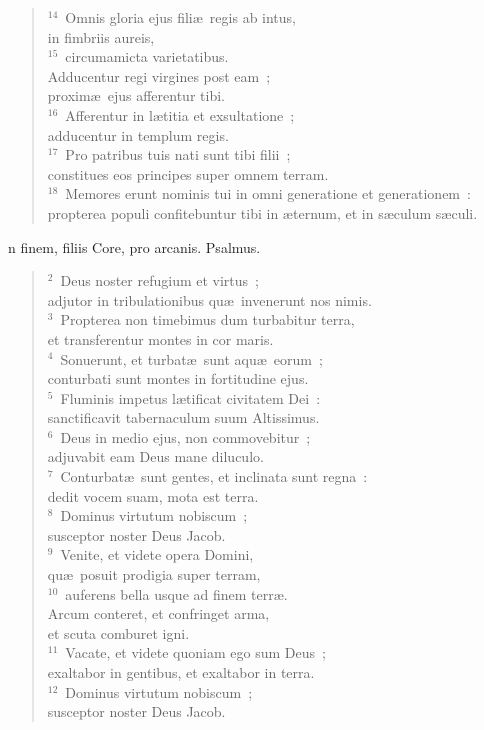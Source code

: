 \begin{verse}
${}^{14}$~Omnis gloria ejus fili\ae\ regis ab intus,\\ in fimbriis aureis,\\
${}^{15}$~circumamicta varietatibus.\\ Adducentur regi virgines post eam~;\\ proxim\ae\ ejus afferentur tibi.\\
${}^{16}$~Afferentur in l\ae titia et exsultatione~;\\ adducentur in templum regis.\\
${}^{17}$~Pro patribus tuis nati sunt tibi filii~;\\ constitues eos principes super omnem terram.\\
${}^{18}$~Memores erunt nominis tui in omni generatione et generationem~:\\ propterea populi confitebuntur tibi in \ae ternum, et in s\ae culum s\ae culi.\end{verse}



\bchapter[Psalm]
n finem, filiis Core, pro arcanis. Psalmus.
\begin{verse}${}^{2}$~Deus noster refugium et virtus~;\\ adjutor in tribulationibus qu\ae\ invenerunt nos nimis.\\
${}^{3}$~Propterea non timebimus dum turbabitur terra,\\ et transferentur montes in cor maris.\\
${}^{4}$~Sonuerunt, et turbat\ae\ sunt aqu\ae\ eorum~;\\ conturbati sunt montes in fortitudine ejus.\\
${}^{5}$~Fluminis impetus l\ae tificat civitatem Dei~:\\ sanctificavit tabernaculum suum Altissimus.\\
${}^{6}$~Deus in medio ejus, non commovebitur~;\\ adjuvabit eam Deus mane diluculo.\\
${}^{7}$~Conturbat\ae\ sunt gentes, et inclinata sunt regna~:\\ dedit vocem suam, mota est terra.\\
${}^{8}$~Dominus virtutum nobiscum~;\\ susceptor noster Deus Jacob.\\
${}^{9}$~Venite, et videte opera Domini,\\ qu\ae\ posuit prodigia super terram,\\
${}^{10}$~auferens bella usque ad finem terr\ae .\\ Arcum conteret, et confringet arma,\\ et scuta comburet igni.\\
${}^{11}$~Vacate, et videte quoniam ego sum Deus~;\\ exaltabor in gentibus, et exaltabor in terra.\\
${}^{12}$~Dominus virtutum nobiscum~;\\ susceptor noster Deus Jacob.\end{verse}



